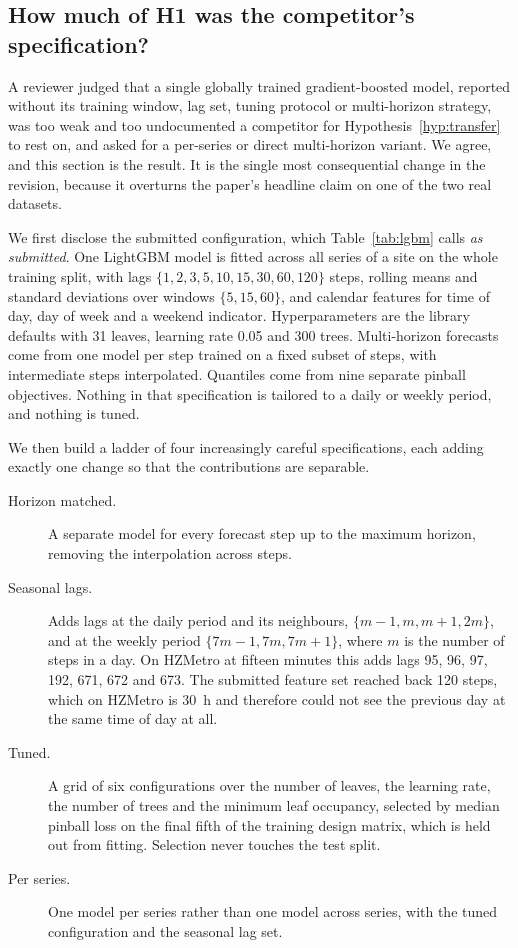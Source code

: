 \documentclass[11pt]{article}
\theoremstyle{plain}
\theoremstyle{definition}
\theoremstyle{remark}
\newif\ifrevisionmarkup
\newcommand{\new}[1]{\ifrevisionmarkup\textcolor{revision}{#1}\else#1\fi}
\begin{document}
\subsection{\new{How much of H1 was the competitor's specification?}}
\label{sec:lgbm}

\new{A reviewer judged that a single globally trained gradient-boosted model, reported without its training window, lag set, tuning protocol or multi-horizon strategy, was too weak and too undocumented a competitor for Hypothesis~\ref{hyp:transfer} to rest on, and asked for a per-series or direct multi-horizon variant. We agree, and this section is the result. It is the single most consequential change in the revision, because it overturns the paper's headline claim on one of the two real datasets.}

\new{We first disclose the submitted configuration, which Table~\ref{tab:lgbm} calls \emph{as submitted}. One LightGBM model is fitted across all series of a site on the whole training split, with lags $\{1,2,3,5,10,15,30,60,120\}$ steps, rolling means and standard deviations over windows $\{5,15,60\}$, and calendar features for time of day, day of week and a weekend indicator. Hyperparameters are the library defaults with \num{31} leaves, learning rate \num{0.05} and \num{300} trees. Multi-horizon forecasts come from one model per step trained on a fixed subset of steps, with intermediate steps interpolated. Quantiles come from nine separate pinball objectives. Nothing in that specification is tailored to a daily or weekly period, and nothing is tuned.}

\new{We then build a ladder of four increasingly careful specifications, each adding exactly one change so that the contributions are separable.}
\new{\begin{description}
\item[Horizon matched.] A separate model for every forecast step up to the maximum horizon, removing the interpolation across steps.
\item[Seasonal lags.] Adds lags at the daily period and its neighbours, $\{m-1, m, m+1, 2m\}$, and at the weekly period $\{7m-1, 7m, 7m+1\}$, where $m$ is the number of steps in a day. On HZMetro at fifteen minutes this adds lags \num{95}, \num{96}, \num{97}, \num{192}, \num{671}, \num{672} and \num{673}. The submitted feature set reached back \num{120} steps, which on HZMetro is \SI{30}{\hour} and therefore could not see the previous day at the same time of day at all.
\item[Tuned.] A grid of six configurations over the number of leaves, the learning rate, the number of trees and the minimum leaf occupancy, selected by median pinball loss on the final fifth of the training design matrix, which is held out from fitting. Selection never touches the test split.
\item[Per series.] One model per series rather than one model across series, with the tuned configuration and the seasonal lag set.
\end{description}}
\end{document}
